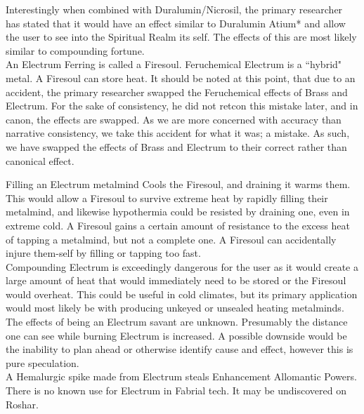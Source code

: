 \documentclass[conference]{IEEEtran}
\begin{document}
Interestingly when combined with Duralumin/Nicrosil, the primary researcher has stated that it would have an effect similar to Duralumin Atium* and allow the user to see into the Spiritual Realm its self.  The effects of this are most likely similar to compounding fortune.\\

An Electrum Ferring is called a Firesoul.  Feruchemical Electrum is a ``hybrid" metal.  A Firesoul can store heat.  It should be noted at this point, that due to an accident, the primary researcher swapped the Feruchemical effects of Brass and Electrum.   For the sake of consistency, he did not retcon this mistake later, and in canon, the effects are swapped.  As we are more concerned with accuracy than narrative consistency, we take this accident for what it was; a mistake.  As such, we have swapped the effects of Brass and Electrum to their correct rather than canonical effect.  

Filling an Electrum metalmind Cools the Firesoul, and draining it warms them.  This would allow a Firesoul to survive extreme heat by rapidly filling their metalmind, and likewise hypothermia could be resisted by draining one, even in extreme cold.  A Firesoul gains a certain amount of resistance to the excess heat of tapping a metalmind, but not a complete one.  A Firesoul can accidentally injure them-self by filling or tapping too fast.\\

Compounding Electrum is exceedingly dangerous for the user as it would create a large amount of heat that would immediately need to be stored or the Firesoul would overheat.  This could be useful in cold climates, but its primary application would most likely be with producing unkeyed or unsealed heating metalminds.\\

The effects of being an Electrum savant are unknown.  Presumably the distance one can see while burning Electrum is increased.  A possible downside would be the inability to plan ahead or otherwise identify cause and effect, however this is pure speculation.\\

A Hemalurgic spike made from Electrum steals Enhancement Allomantic Powers.\\

There is no known use for Electrum in Fabrial tech.  It may be undiscovered on Roshar.
\end{document}
